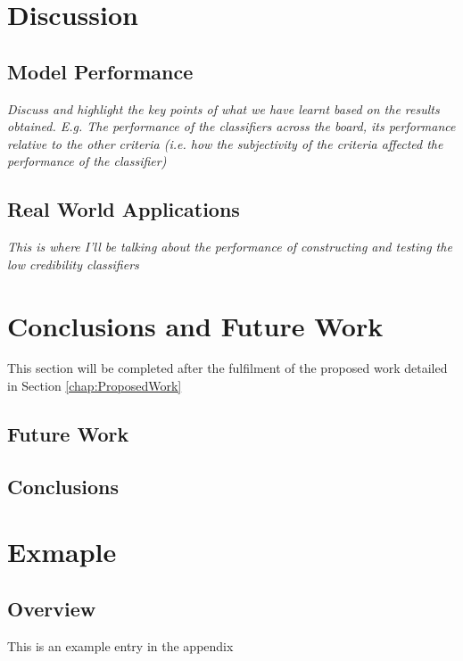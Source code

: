 \documentclass[a4paper,twoside,phd]{BYUPhys}
\begin{document}
\chapter{Discussion}
\label{chap:Discussion}

\section{Model Performance}
\label{sec:ModelPerformance}
\textit{Discuss and highlight the key points of what we have learnt based on the results obtained. E.g. The performance of the classifiers across the board, its performance relative to the other criteria (i.e. how the subjectivity of the criteria affected the performance of the classifier)}

\section{Real World Applications}
\label{sec:RealWorldApplication}
\textit{This is where I'll be talking about the performance of constructing and testing the low credibility classifiers}

\chapter{Conclusions and Future Work}
\label{chap:Conclusions}
This section will be completed after the fulfilment of the proposed work detailed in Section \ref{chap:ProposedWork}

\section{Future Work}
\label{FutureWork}

\section{Conclusions}
\label{sec:ConclusionsConclusions}



\clearemptydoublepage


\appendix
\chapter{Exmaple}
\section{Overview}
This is an example entry in the appendix



%

%

%
\end{document}
